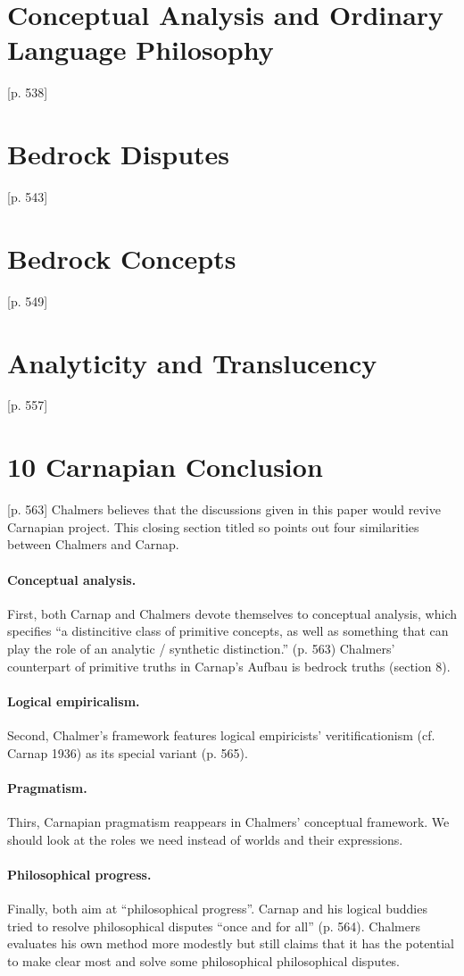 \documentclass[
10pt, %
a4paper, %
twocolumn, %
landscape %
]{article}
\begin{document}
\section{Conceptual Analysis and Ordinary Language Philosophy}
[p. 538]
\section{Bedrock Disputes}
[p. 543]
\section{Bedrock Concepts}
[p. 549]
\section{Analyticity and Translucency}
[p. 557]
\section*{10  Carnapian Conclusion}
[p. 563]
Chalmers believes that the discussions given in this paper would revive Carnapian project. This closing section titled so points out four similarities between Chalmers and Carnap.

\paragraph{Conceptual analysis.}
First, both Carnap and Chalmers devote themselves to conceptual analysis, which specifies ``a distincitive class of primitive concepts, as well as something that can play the role of an analytic / synthetic distinction.'' (p. 563) Chalmers' counterpart of primitive truths in Carnap's Aufbau is bedrock truths (section 8).

\paragraph{Logical empiricalism.}
Second, Chalmer's framework features logical empiricists' veritificationism (cf. Carnap 1936) as its special variant (p. 565).

\paragraph{Pragmatism.}
Thirs, Carnapian pragmatism reappears in Chalmers' conceptual framework. We should look at the roles we need instead of worlds and their expressions.

\paragraph{Philosophical progress.}
Finally, both aim at ``philosophical progress''. Carnap and his logical buddies tried to resolve philosophical disputes ``once and for all'' (p. 564). Chalmers evaluates his own method more modestly but still claims that it has the potential to make clear most and solve some philosophical philosophical disputes.
\end{document}

